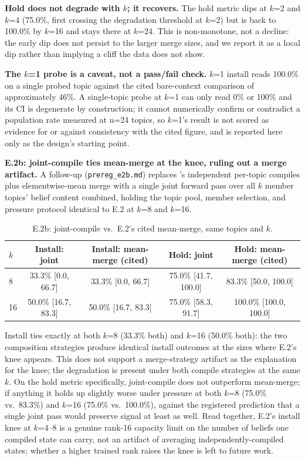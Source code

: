 \textbf{Hold does not degrade with \(k\); it recovers.} The hold metric dips at \(k\)=2
and \(k\)=4 (75.0\%, first crossing the degradation threshold at \(k\)=2) but is back to
100.0\% by \(k\)=16 and stays there at \(k\)=24. This is non-monotone, not a decline: the
early dip does not persist to the larger merge sizes, and we report it as a local
dip rather than implying a cliff the data does not show.

\textbf{The \(k\)=1 probe is a caveat, not a pass/fail check.} \(k\)=1 install reads
100.0\% on a single probed topic against the cited bare-context comparison of
approximately 46\%. A single-topic probe at \(k\)=1 can only read 0\% or 100\% and its CI
is degenerate by construction; it cannot numerically confirm or contradict a population
rate measured at n=24 topics, so \(k\)=1's result is not scored as evidence for or
against consistency with the cited figure, and is reported here only as the design's
starting point.

\textbf{E.2b: joint-compile ties mean-merge at the knee, ruling out a merge artifact.}
A follow-up (\texttt{prereg\_e2b.md}) replaces \condF{}'s independent per-topic compiles
plus elementwise-mean merge with a single joint forward pass over all \(k\) member
topics' belief content combined, holding the topic pool, member selection, and pressure
protocol identical to E.2 at \(k\)=8 and \(k\)=16.

\begin{table}[h]
\centering
\caption{E.2b: joint-compile vs.\ E.2's cited mean-merge, same topics and \(k\).}
\label{tab:e2b-joint}
\begin{tabular}{lcccc}
\toprule
\(k\) & Install: joint & Install: mean-merge (cited) & Hold: joint & Hold: mean-merge (cited) \\
\midrule
8 & 33.3\% [0.0, 66.7] & 33.3\% [0.0, 66.7] & 75.0\% [41.7, 100.0] & 83.3\% [50.0, 100.0] \\
16 & 50.0\% [16.7, 83.3] & 50.0\% [16.7, 83.3] & 75.0\% [58.3, 91.7] & 100.0\% [100.0, 100.0] \\
\bottomrule
\end{tabular}
\end{table}

Install ties exactly at both \(k\)=8 (33.3\% both) and \(k\)=16 (50.0\% both): the two
composition strategies produce identical install outcomes at the sizes where E.2's knee
appears. This does not support a merge-strategy artifact as the explanation for the
knee; the degradation is present under both compile strategies at the same \(k\). On the
hold metric specifically, joint-compile does not outperform mean-merge; if anything it
holds up slightly worse under pressure at both \(k\)=8 (75.0\% vs.\ 83.3\%) and \(k\)=16
(75.0\% vs.\ 100.0\%), against the registered prediction that a single joint pass would
preserve signal at least as well. Read together, E.2's install knee at \(k\)=4--8 is a
genuine rank-16 capacity limit on the number of beliefs one compiled state can carry, not
an artifact of averaging independently-compiled states; whether a higher trained rank
raises the knee is left to future work.

